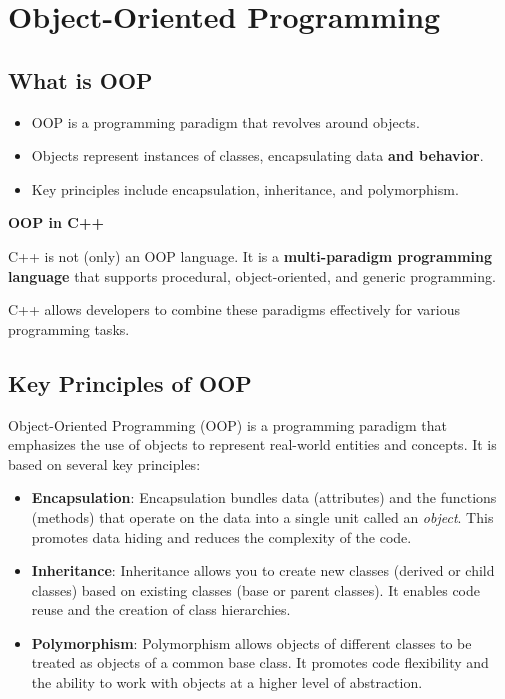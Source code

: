 \chapter{Object-Oriented Programming}

\section{What is OOP}

\begin{itemize}
    \item OOP is a programming paradigm that revolves around objects.
    \item Objects represent instances of classes, encapsulating data \textbf{and behavior}.
    \item Key principles include encapsulation, inheritance, and polymorphism.
\end{itemize}

\begin{definitionblock}
    
    \textbf{OOP in C++}
    
    C++ is not (only) an OOP language. It is a \textbf{multi-paradigm programming language} that supports procedural, object-oriented, and generic programming. 
    
    C++ allows developers to combine these paradigms effectively for various programming tasks.
\end{definitionblock}

\section{Key Principles of OOP}

Object-Oriented Programming (OOP) is a programming paradigm that emphasizes the use of objects to represent real-world entities and concepts. It is based on several key principles:

\begin{itemize}
    \item \textbf{Encapsulation}: Encapsulation bundles data (attributes) and the functions (methods) that operate on the data into a single unit called an \textit{object}. This promotes data hiding and reduces the complexity of the code.
    \item \textbf{Inheritance}: Inheritance allows you to create new classes (derived or child classes) based on existing classes (base or parent classes). It enables code reuse and the creation of class hierarchies.
    \item \textbf{Polymorphism}: Polymorphism allows objects of different classes to be treated as objects of a common base class. It promotes code flexibility and the ability to work with objects at a higher level of abstraction.
\end{itemize}

